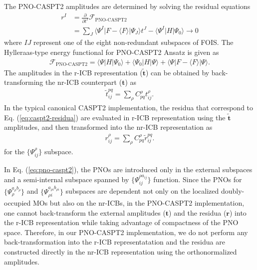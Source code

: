 \documentclass[aip,jcp,amsmath]{revtex4-1}
\begin{document}
The PNO-CASPT2 amplitudes are determined by solving the residual equations
%
\begin{align}
  r^I&=\frac{\partial}{\partial t^I}\mathscr{F}_\text{PNO-CASPT2} \nonumber \\
     &=\sum_J \langle\Psi^I|F-\langle F\rangle|\Psi_J\rangle t^J-\langle\Psi^I|H|\Psi_0\rangle\rightarrow 0 \label{eq:caspt2-residua}
\end{align}
%
where $IJ$ represent one of the eight non-redundant subspaces of FOIS.
%
The Hylleraas-type energy functional for PNO-CASPT2 Ansatz is given as
%
\begin{align}
  \mathscr{F}_\text{PNO-CASPT2}=\langle\Psi|H|\Psi_0\rangle+\langle\Psi_0|H|\Psi\rangle+\langle\Psi|F-\langle F\rangle|\Psi\rangle.
\end{align}
%
The amplitudes in the r-ICB representation ($\tilde{\mathbf{t}}$) can be obtained by back-transforming the nr-ICB counterpart ($\mathbf{t}$) as
%
\begin{align}
  \tilde{t}^{pq}_{ij} = \sum_{\rho} C_{pq}^\rho  t^{\rho}_{ij}.
\end{align}
%
In the typical canonical CASPT2 implementation, the residua that correspond to Eq. (\ref{eq:caspt2-residua}) are evaluated in r-ICB representation using the $\tilde{\mathbf{t}}$ amplitudes, and then transformed into the nr-ICB representation as
%
\begin{align}
  r^{\rho}_{ij}=\sum_{\rho} C_{pq}^\rho \tilde{r}^{pq}_{ij}.
\end{align}
for the $\{\Psi^{\rho}_{ij}\}$ subspace.

%
In Eq. (\ref{eq:pno-caspt2}), the PNOs are introduced only in the external subspaces and a semi-internal subspace spanned by $\{\Psi_{ij}^{\rho a_{ij}}\}$ function.
%
Since the PNOs for $\{\Psi_{\rho}^{a_{\rho}b_{\rho}}\}$ and $\{\Psi_{\rho i}^{a_{\rho i}b_{\rho i}}\}$ subspaces are dependent not only on the localized doubly-occupied MOs but also on the nr-ICBs, in the PNO-CASPT2 implementation, one cannot back-transform the external amplitudes ($\mathbf{t}$) and the residua ($\mathbf{r}$) into the r-ICB representation while taking advantage of compactness of the PNO space.
%
Therefore, in our PNO-CASPT2 implementation, we do not perform any back-transformation into the r-ICB representatation and the residua are constructed directly in the nr-ICB representation using the orthonormalized amplitudes.
%
\end{document}
